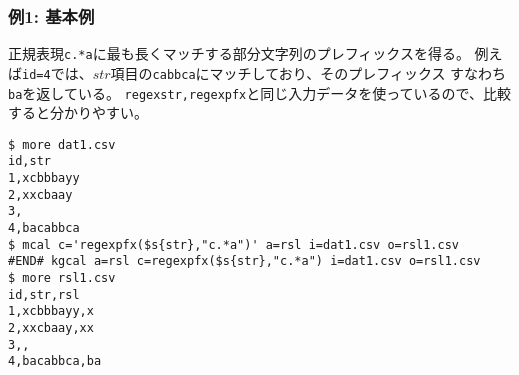 \subsubsection*{例1: 基本例}

正規表現\verb|c.*a|に最も長くマッチする部分文字列のプレフィックスを得る。
例えば\verb|id=4|では、$str$項目の\verb|cabbca|にマッチしており、そのプレフィックス
すなわち\verb|ba|を返している。
\verb|regexstr,regexpfx|と同じ入力データを使っているので、比較すると分かりやすい。


\begin{Verbatim}[baselinestretch=0.7,frame=single]
$ more dat1.csv
id,str
1,xcbbbayy
2,xxcbaay
3,
4,bacabbca
$ mcal c='regexpfx($s{str},"c.*a")' a=rsl i=dat1.csv o=rsl1.csv
#END# kgcal a=rsl c=regexpfx($s{str},"c.*a") i=dat1.csv o=rsl1.csv
$ more rsl1.csv
id,str,rsl
1,xcbbbayy,x
2,xxcbaay,xx
3,,
4,bacabbca,ba
\end{Verbatim}
